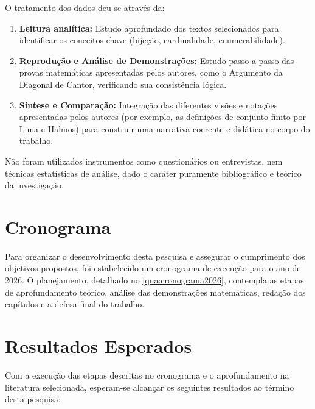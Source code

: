 O tratamento dos dados deu-se através da:
\begin{enumerate}
    \item \textbf{Leitura analítica:} Estudo aprofundado dos textos selecionados para identificar os conceitos-chave (bijeção, cardinalidade, enumerabilidade).
    \item \textbf{Reprodução e Análise de Demonstrações:} Estudo passo a passo das provas matemáticas apresentadas pelos autores, como o Argumento da Diagonal de Cantor, verificando sua consistência lógica.
    \item \textbf{Síntese e Comparação:} Integração das diferentes visões e notações apresentadas pelos autores (por exemplo, as definições de conjunto finito por Lima e Halmos) para construir uma narrativa coerente e didática no corpo do trabalho.
\end{enumerate}

Não foram utilizados instrumentos como questionários ou entrevistas, nem técnicas estatísticas de análise, dado o caráter puramente bibliográfico e teórico da investigação.

\section{Cronograma}
\label{sec:cronograma}

Para organizar o desenvolvimento desta pesquisa e assegurar o cumprimento dos objetivos propostos, foi estabelecido um cronograma de execução para o ano de 2026. O planejamento, detalhado no \autoref{qua:cronograma2026}, contempla as etapas de aprofundamento teórico, análise das demonstrações matemáticas, redação dos capítulos e a defesa final do trabalho.



\section{Resultados Esperados}
\label{sec:resultados_esperados}

Com a execução das etapas descritas no cronograma e o aprofundamento na literatura selecionada, esperam-se alcançar os seguintes resultados ao término desta pesquisa:


